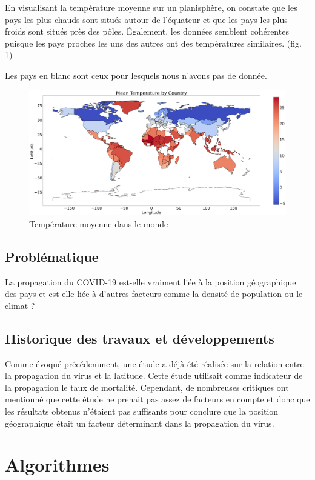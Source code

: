 \documentclass[12pt]{iEEEtran}
\begin{document}
En visualisant la température moyenne sur un planisphère, on constate que les pays les plus
chauds sont situés autour de l'équateur et que les pays les plus froids sont situés près des
pôles. Également, les données semblent cohérentes puisque les pays proches les uns des autres
ont des températures similaires. (fig. \ref{fig:temp_world})

Les pays en blanc sont ceux pour lesquels nous n'avons pas de donnée.

\begin{figure}[h]
    \centering
    \includegraphics[width=\columnwidth]{img/temp_world.png}
    \caption{Température moyenne dans le monde}
    \label{fig:temp_world}
\end{figure}

\subsection{Problématique}
La propagation du COVID-19 est-elle vraiment liée à la position géographique des pays
et est-elle liée à d'autres facteurs comme la densité de population ou le climat ?

\subsection{Historique des travaux et développements}
Comme évoqué précédemment, une étude \cite{kaggle} a déjà été réalisée sur la relation entre
la propagation du virus et la latitude. Cette étude utilisait comme indicateur de la propagation
le taux de mortalité. Cependant, de nombreuses critiques ont mentionné que cette étude ne prenait
pas assez de facteurs en compte et donc que les résultats obtenus n'étaient pas suffisants pour
conclure que la position géographique était un facteur déterminant dans la propagation du virus.

\newpage
\section{Algorithmes}
\end{document}
